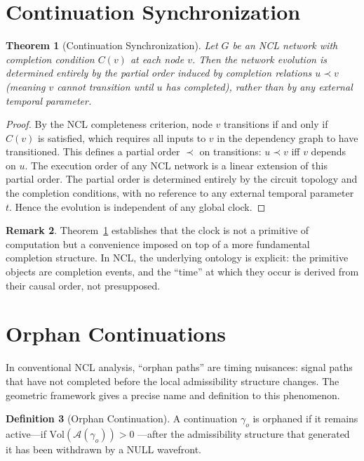 \documentclass[12pt, oneside]{book}
\theoremstyle{flyxion}
\newtheorem{theorem}{Theorem}[chapter]
\theoremstyle{definition}
\newtheorem{definition}[theorem]{Definition}
\newtheorem{remark}[theorem]{Remark}
\begin{document}
\section{Continuation Synchronization}

\begin{theorem}[Continuation Synchronization]
\label{thm:cont_sync}
Let $G$ be an NCL network with completion condition
$C(v)$ at each node $v$. Then the network evolution
is determined entirely by the partial order induced
by completion relations $u \prec v$ (meaning $v$
cannot transition until $u$ has completed), rather
than by any external temporal parameter.
\end{theorem}

\begin{proof}
By the NCL completeness criterion, node $v$ transitions
if and only if $C(v)$ is satisfied, which requires all
inputs to $v$ in the dependency graph to have
transitioned. This defines a partial order $\prec$ on
transitions: $u \prec v$ iff $v$ depends on $u$.
The execution order of any NCL network is a linear
extension of this partial order. The partial order is
determined entirely by the circuit topology and the
completion conditions, with no reference to any
external temporal parameter $t$. Hence the evolution
is independent of any global clock.
\end{proof}

\begin{remark}
Theorem~\ref{thm:cont_sync} establishes that the clock
is not a primitive of computation but a convenience
imposed on top of a more fundamental completion
structure. In NCL, the underlying ontology is explicit:
the primitive objects are completion events, and the
``time'' at which they occur is derived from their
causal order, not presupposed.
\end{remark}

\section{Orphan Continuations}

In conventional NCL analysis, ``orphan paths'' are
timing nuisances: signal paths that have not completed
before the local admissibility structure changes.
The geometric framework gives a precise name and
definition to this phenomenon.

\begin{definition}[Orphan Continuation]
A continuation $\gamma_o$ is orphaned if it remains
active---if $\mathrm{Vol}(\mathcal{A}(\gamma_o)) > 0$
---after the admissibility structure that generated
it has been withdrawn by a NULL wavefront.
\end{definition}
\end{document}
